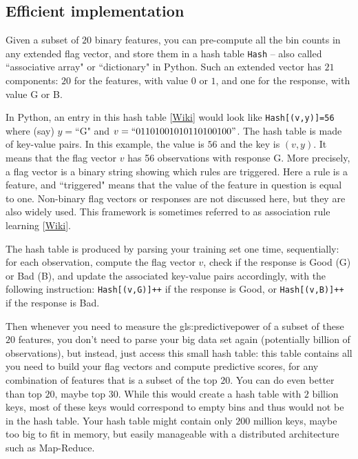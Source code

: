 \documentclass[oneside,10pt]{book}
\begin{document}
\subsection{Efficient implementation} \label{effsdxc}

Given a subset of $20$ binary features, you can pre-compute all the bin counts in any extended \textcolor{index}{flag vector}, and store them in a hash table \texttt{Hash} -- also called
 ``associative array"  or ``dictionary" in Python. Such an extended vector has $21$ components:
$20$ for the features, with value  $0$ or $1$, and one for the response, with value G or B.




In Python, an entry in this \textcolor{index}{hash table} [\href{https://en.wikipedia.org/wiki/Hash_table}{Wiki}] would look like \texttt{Hash[(v,y)]=56}
 where  (say)  $y=\text{``G"}$ and $v=``01101001010110100100"$.
The hash table is made of  \textcolor{index}{key-value pairs}. In this example, the value is $56$ and the key is $(v,y)$.
It means that the flag vector $v$ has 56 observations with response G. More precisely, a flag vector is a binary string showing which rules are triggered.  Here a rule is a feature, and ``triggered" means that the value of the feature in question is equal to one. Non-binary flag vectors or responses are not discussed here, but they are also widely used.  This framework is sometimes referred to as \textcolor{index}{association rule learning} [\href{https://en.wikipedia.org/wiki/Association_rule_learning}{Wiki}].

The hash table is produced by parsing your training set one time, sequentially: for each observation, compute the flag vector $v$, check if the response is Good (G) or Bad (B), and update the associated key-value pairs accordingly, with the following instruction:
\texttt{Hash[(v,G)]++} if the response is Good, or \texttt{Hash[(v,B)]++} if the response is Bad.



Then whenever you need to measure the \gls{gls:predictivepower} of a subset of these $20$ features, you don’t need to parse your big data set again (potentially billion of observations), but instead, just access this small hash table: this table contains all you need to build your flag vectors and compute predictive scores, for any combination of features that is a subset of the top $20$. You can  do even better than top $20$, maybe top $30$. While this would create a hash table with $2$ billion keys, most of these keys would correspond to empty bins and thus would not be in the hash table. Your hash table might contain only $200$ million keys, maybe too big to fit in  memory, but easily manageable with a distributed architecture such as Map-Reduce.
\end{document}
